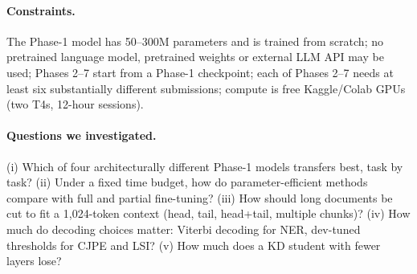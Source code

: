 \documentclass[11pt]{article}
\begin{document}
\begin{table}[H]
\centering\small
\caption{Tasks and primary metrics.}
\label{tab:tasks}
\end{table}

\paragraph{Constraints.} The Phase-1 model has 50--300M parameters and is trained from scratch; no pretrained language model, pretrained weights or external LLM API may be used; Phases 2--7 start from a Phase-1 checkpoint; each of Phases 2--7 needs at least six substantially different submissions; compute is free Kaggle/Colab GPUs (two T4s, 12-hour sessions).

\paragraph{Questions we investigated.} (i) Which of four architecturally different Phase-1 models transfers best, task by task? (ii) Under a fixed time budget, how do parameter-efficient methods compare with full and partial fine-tuning? (iii) How should long documents be cut to fit a 1{,}024-token context (head, tail, head+tail, multiple chunks)? (iv) How much do decoding choices matter: Viterbi decoding for NER, dev-tuned thresholds for CJPE and LSI? (v) How much does a KD student with fewer layers lose?
\end{document}
